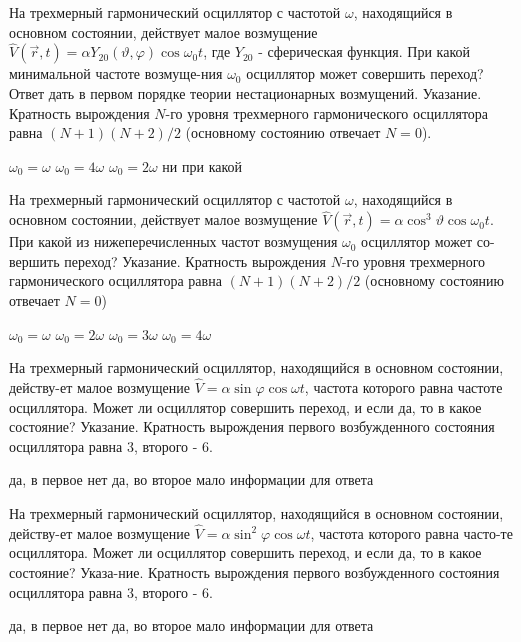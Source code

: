 \documentclass[11pt,a4paper]{exam}
\begin{document}
\begin{questions}
\question На трехмерный гармонический осциллятор с частотой $\omega $, находящийся в основном состоянии, действует малое возмущение $\hat V(\vec r,t) = \alpha {Y_{20}}(\vartheta ,\varphi )\cos {\omega _0}t$, где ${Y_{20}}$ - сферическая функция. При какой минимальной частоте возмуще-ния ${\omega _0}$ осциллятор может совершить переход? Ответ дать в первом порядке теории нестационарных возмущений. Указание. Кратность вырождения $N$-го уровня трехмерного гармонического осциллятора равна $(N + 1)(N + 2)/2$ (основному состоянию отвечает $N = 0$).
\begin{choices}
\choice ${\omega _0} = \omega $ 
\choice ${\omega _0} = 4\omega $   
\choice ${\omega _0} = 2\omega $   
\choice ни при какой
\end{choices}

\question На трехмерный гармонический осциллятор с частотой $\omega $, находящийся в основном состоянии, действует малое возмущение $\hat V(\vec r,t) = \alpha {\cos ^3}\vartheta \cos {\omega _0}t$. При какой из нижеперечисленных частот возмущения ${\omega _0}$ осциллятор может со-вершить переход? Указание. Кратность вырождения $N$-го уровня трехмерного гармонического осциллятора равна $(N + 1)(N + 2)/2$ (основному состоянию отвечает $N = 0$)
\begin{choices}
\choice ${\omega _0} = \omega $ 
\choice ${\omega _0} = 2\omega $   
\choice ${\omega _0} = 3\omega $   
\choice ${\omega _0} = 4\omega $
\end{choices}

\question На трехмерный гармонический осциллятор, находящийся в основном состоянии, действу-ет малое возмущение $\hat V = \alpha \sin \varphi \cos \omega t$, частота которого равна частоте осциллятора. Может ли осциллятор совершить переход, и если да, то в какое состояние? Указание. Кратность вырождения первого возбужденного состояния осциллятора равна 3, второго - 6.
\begin{choices}
\choice да, в первое   
\choice нет      
\choice да, во второе  
\choice мало информации для ответа
\end{choices}

\question На трехмерный гармонический осциллятор, находящийся в основном состоянии, действу-ет малое возмущение $\hat V = \alpha {\sin ^2}\varphi \cos \omega t$, частота которого равна часто-те осциллятора. Может ли осциллятор совершить переход, и если да, то в какое состояние? Указа-ние. Кратность вырождения первого возбужденного состояния осциллятора равна 3, второго - 6.
\begin{choices}
\choice да, в первое   
\choice нет      
\choice да, во второе  
\choice мало информации для ответа
\end{choices}


\end{questions}
\end{document}
